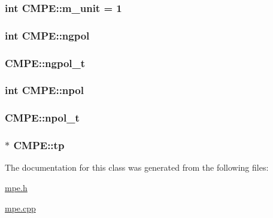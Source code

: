 \hypertarget{classCMPE_adf1757fa41fec1996e7ca1c7fe6fc9e0}{
\subsubsection[{m\-\_\-unit}]{\setlength{\rightskip}{0pt plus 5cm}int C\-M\-P\-E\-::m\-\_\-unit = 1\hspace{0.3cm}{\ttfamily [static]}}}\label{classCMPE_adf1757fa41fec1996e7ca1c7fe6fc9e0}
\hypertarget{classCMPE_a17b9196644f13740f99675a5a0d8ef23}{
\subsubsection[{ngpol}]{\setlength{\rightskip}{0pt plus 5cm}int C\-M\-P\-E\-::ngpol}}\label{classCMPE_a17b9196644f13740f99675a5a0d8ef23}
\hypertarget{classCMPE_afc7b0e78e954f7bb1419864a70c4d0b7}{
\subsubsection[{ngpol\-\_\-t}]{ C\-M\-P\-E\-::ngpol\-\_\-t}}\label{classCMPE_afc7b0e78e954f7bb1419864a70c4d0b7}
\hypertarget{classCMPE_a5e34c1f47c24748db2704af61b370fc0}{
\subsubsection[{npol}]{\setlength{\rightskip}{0pt plus 5cm}int C\-M\-P\-E\-::npol\hspace{0.3cm}{\ttfamily [static]}}}\label{classCMPE_a5e34c1f47c24748db2704af61b370fc0}
\hypertarget{classCMPE_a4e0a6b27c4cd14dd576fe94854c8d58d}{
\subsubsection[{npol\-\_\-t}]{ C\-M\-P\-E\-::npol\-\_\-t\hspace{0.3cm}{\ttfamily [static]}}}\label{classCMPE_a4e0a6b27c4cd14dd576fe94854c8d58d}
\hypertarget{classCMPE_a0e97f318480ca27d2a7d608379bd2d03}{
\subsubsection[{tp}]{ $\ast$ C\-M\-P\-E\-::tp\hspace{0.3cm}{\ttfamily [static]}}}\label{classCMPE_a0e97f318480ca27d2a7d608379bd2d03}


The documentation for this class was generated from the following files\-:\begin{DoxyCompactItemize}
\item 
\hyperlink{mpe_8h}{mpe.\-h}\item 
\hyperlink{mpe_8cpp}{mpe.\-cpp}\end{DoxyCompactItemize}
